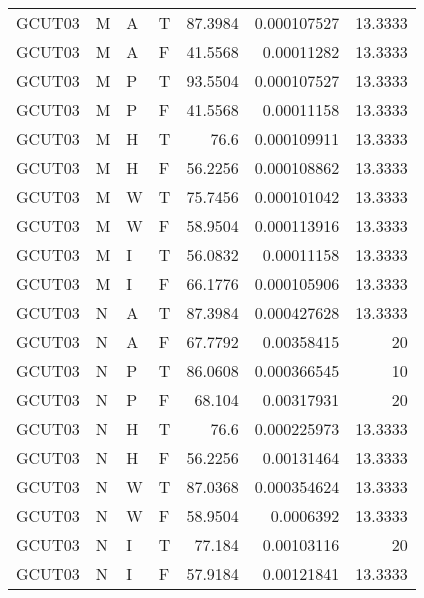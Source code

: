\begin{tabular}{llllrrr}
    GCUT03   & M     & A     & T          & 87.3984    & 0.000107527 & 13.3333  \\
    GCUT03   & M     & A     & F          & 41.5568    & 0.00011282  & 13.3333  \\
    GCUT03   & M     & P     & T          & 93.5504    & 0.000107527 & 13.3333  \\
    GCUT03   & M     & P     & F          & 41.5568    & 0.00011158  & 13.3333  \\
    GCUT03   & M     & H     & T          & 76.6       & 0.000109911 & 13.3333  \\
    GCUT03   & M     & H     & F          & 56.2256    & 0.000108862 & 13.3333  \\
    GCUT03   & M     & W     & T          & 75.7456    & 0.000101042 & 13.3333  \\
    GCUT03   & M     & W     & F          & 58.9504    & 0.000113916 & 13.3333  \\
    GCUT03   & M     & I     & T          & 56.0832    & 0.00011158  & 13.3333  \\
    GCUT03   & M     & I     & F          & 66.1776    & 0.000105906 & 13.3333  \\
    GCUT03   & N     & A     & T          & 87.3984    & 0.000427628 & 13.3333  \\
    GCUT03   & N     & A     & F          & 67.7792    & 0.00358415  & 20       \\
    GCUT03   & N     & P     & T          & 86.0608    & 0.000366545 & 10       \\
    GCUT03   & N     & P     & F          & 68.104     & 0.00317931  & 20       \\
    GCUT03   & N     & H     & T          & 76.6       & 0.000225973 & 13.3333  \\
    GCUT03   & N     & H     & F          & 56.2256    & 0.00131464  & 13.3333  \\
    GCUT03   & N     & W     & T          & 87.0368    & 0.000354624 & 13.3333  \\
    GCUT03   & N     & W     & F          & 58.9504    & 0.0006392   & 13.3333  \\
    GCUT03   & N     & I     & T          & 77.184     & 0.00103116  & 20       \\
    GCUT03   & N     & I     & F          & 57.9184    & 0.00121841  & 13.3333  \\
    \hline
\end{tabular}